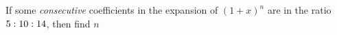 
%
%
%
%      
% 
% 
%   



\gcalcexpr[0]\tp{\vbone + \vbtwo}
\gcalcexpr[0]\tq{\vbtwo + \vbthree}
\gcalcexpr[2]\tr{\tq / \tp}
\gcalcexpr[0]\ts{(\tr * \vbone + \vbthree) / (\vbtwo - \tr * \vbone)}

\question[4] If some \textit{consecutive} coefficients in the expansion of $(1+x)^n$ are in the 
ratio $5:10:14$, then find $n$

